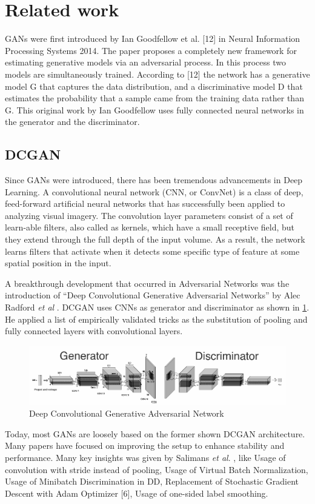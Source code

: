 \documentclass{vldb}
\begin{document}
\section{Related work}
GANs were first introduced by Ian Goodfellow et al. [12] in Neural Information
Processing Systems 2014. The paper proposes a completely new framework for estimating
generative models via an adversarial process. In this process two models are
simultaneously trained. According to [12] the network has a generative model G that
captures the data distribution, and a discriminative model D that estimates the probability
that a sample came from the training data rather than G. This original work
by Ian Goodfellow uses fully connected neural networks in the generator and the discriminator.

\subsection{DCGAN}
Since GANs were introduced, there has been tremendous advancements in Deep Learning. A convolutional neural network (CNN, or ConvNet) \cite{imagenet} is a class of deep, feed-forward artificial neural networks that has successfully been applied to analyzing visual imagery. The convolution layer parameters consist of a set of learn-able filters, also called as kernels, which have a small receptive field, but they extend through the full depth of the input volume. As a result, the network learns filters that activate when it detects some specific type of feature at some spatial position in the input.
\par\bigskip
A breakthrough development that occurred in Adversarial Networks was the introduction of “Deep Convolutional Generative Adversarial Networks” by Alec Radford \textit{et al} \cite{dcgan}. DCGAN uses CNNs as generator and discriminator as shown in \ref{fig:dcgan}. He applied a list of empirically validated tricks as the substitution of pooling and fully connected layers with convolutional layers.
\par\bigskip
\begin{figure}[H]
\centering\includegraphics[width=\linewidth]{../Final_Report/images/dcgan.png}
\caption{Deep Convolutional Generative Adversarial Network}
\label{fig:dcgan}
\end{figure}
Today, most GANs are loosely based on the former shown DCGAN \cite{dcgan} architecture. Many papers have focused on improving the setup to enhance stability and performance. Many key insights was given by Salimans \textit{et al}. \cite{improvedgan}, like Usage of convolution with stride instead of pooling, Usage of Virtual Batch Normalization, Usage of Minibatch Discrimination in DD, Replacement of Stochastic Gradient Descent with Adam Optimizer [6], Usage of one-sided label smoothing.
\par\bigskip
\end{document}

